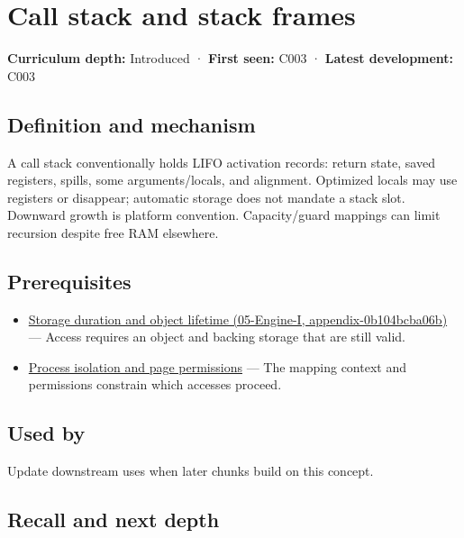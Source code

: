 \hypertarget{appendix-b081b7abe193}{}
\section{Call stack and stack frames}\label{appendix-b081b7abe193-call-stack-and-stack-frames}

\textbf{Curriculum depth:} Introduced · \textbf{First seen:} C003 · \textbf{Latest development:} C003

\subsection{Definition and mechanism}\label{appendix-b081b7abe193-definition-and-mechanism}

A call stack conventionally holds LIFO activation records: return state, saved registers, spills, some arguments/locals, and alignment. Optimized locals may use registers or disappear; automatic storage does not mandate a stack slot. Downward growth is platform convention. Capacity/guard mappings can limit recursion despite free RAM elsewhere.

\subsection{Prerequisites}\label{appendix-b081b7abe193-prerequisites}

\begin{itemize}
\tightlist
\item
  \href{../05-Engine-I/main.pdf\#nameddest=appendix-0b104bcba06b}{Storage duration and object lifetime (05-Engine-I, appendix-0b104bcba06b)} --- Access requires an object and backing storage that are still valid.
\item
  \hyperref[appendix-c2a9ad1e2b49]{Process isolation and page permissions} --- The mapping context and permissions constrain which accesses proceed.
\end{itemize}

\subsection{Used by}\label{appendix-b081b7abe193-used-by}

Update downstream uses when later chunks build on this concept.

\subsection{Recall and next depth}\label{appendix-b081b7abe193-recall-and-next-depth}

